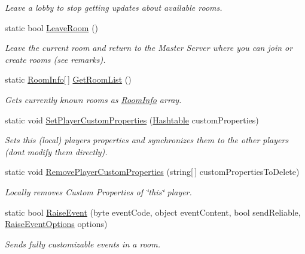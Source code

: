 \begin{DoxyCompactItemize}
\begin{DoxyCompactList}\small\item\em Leave a lobby to stop getting updates about available rooms. \end{DoxyCompactList}\item 
static bool \hyperlink{class_photon_network_abb27939f0325b53c94f5ad52199b63b7}{Leave\+Room} ()
\begin{DoxyCompactList}\small\item\em Leave the current room and return to the Master Server where you can join or create rooms (see remarks). \end{DoxyCompactList}\item 
static \hyperlink{class_room_info}{Room\+Info}\mbox{[}$\,$\mbox{]} \hyperlink{class_photon_network_aeef2085375accb7d4bc88e60cbe15eb9}{Get\+Room\+List} ()
\begin{DoxyCompactList}\small\item\em Gets currently known rooms as \hyperlink{class_room_info}{Room\+Info} array. \end{DoxyCompactList}\item 
static void \hyperlink{class_photon_network_a3badca00ee2bacec4eaccac76002f0ac}{Set\+Player\+Custom\+Properties} (\hyperlink{_extensions_8cs_afa613ef589c02dbd94acc273b62cdcfd}{Hashtable} custom\+Properties)
\begin{DoxyCompactList}\small\item\em Sets this (local) player\textquotesingle{}s properties and synchronizes them to the other players (don\textquotesingle{}t modify them directly). \end{DoxyCompactList}\item 
static void \hyperlink{class_photon_network_a4c59e3c4feeaf44293eef1d8d19b98a2}{Remove\+Player\+Custom\+Properties} (string\mbox{[}$\,$\mbox{]} custom\+Properties\+To\+Delete)
\begin{DoxyCompactList}\small\item\em Locally removes Custom Properties of \char`\"{}this\char`\"{} player. \end{DoxyCompactList}\item 
static bool \hyperlink{class_photon_network_aa9088b089a8c1b3548f8a7a792146e50}{Raise\+Event} (byte event\+Code, object event\+Content, bool send\+Reliable, \hyperlink{class_raise_event_options}{Raise\+Event\+Options} options)
\begin{DoxyCompactList}\small\item\em Sends fully customizable events in a room. \end{DoxyCompactList}\item 

\end{DoxyCompactItemize}
